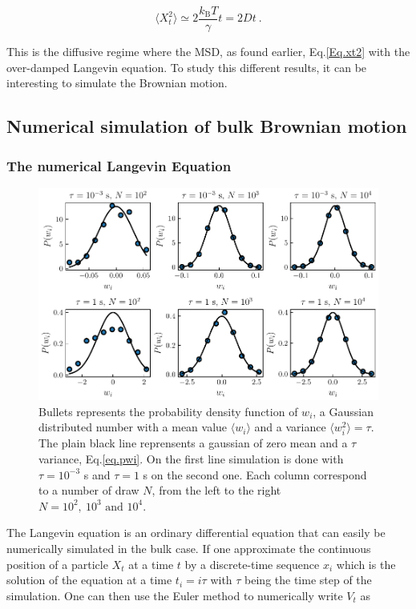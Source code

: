 \begin{equation}
	\langle X_t ^2 \rangle \simeq 2 \frac{k_\mathrm{B}T}{\gamma} t = 2Dt ~.
	\label{eq:longtimemsd}
\end{equation}

This is the diffusive regime where the \gls{MSD}, as found earlier, Eq.\ref{Eq.xt2} with the over-damped Langevin equation. To study this different results, it can be interesting to simulate the Brownian motion.

\subsection{Numerical simulation of bulk Brownian motion}

\subsubsection{The numerical Langevin Equation}

\begin{figure}[!hb]
	\centering
	\includegraphics{02_body/chapter1/image/noise_simulation/exemple.pdf}
	\caption{Bullets represents the probability density function of $w_i$, a Gaussian distributed number with a mean value $\langle w_i \rangle$ and a variance $\langle w_i ^2 \rangle  = \tau$. The plain black line reprensents a gaussian of zero mean and a $\tau$ variance, Eq.\ref{eq.pwi}. On the first line simulation is done with $\tau = 10^{-3}$ s and $\tau = 1$ s on the second one. Each column correspond to a number of draw $N$, from the left to the right $N=10^2, ~10^3 \text{ and } 10^4$. }
	\label{fig:exempleprecisionwi}
\end{figure}


The Langevin equation is an ordinary differential equation that can easily be numerically simulated in the bulk case. If one approximate the continuous position of a particle $X_t$ at a time $t$ by a discrete-time sequence $x_i$ which is the solution of the equation at a time $t_i = i  \tau$ with $\tau$ being the time step of the simulation. One can then use the Euler method to numerically write $V_t$ as

